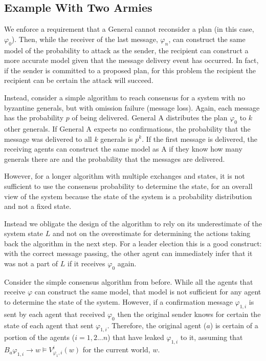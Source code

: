\subsection{Example With Two Armies}

We enforce a requirement that a General cannot reconsider a plan (in this case, $\varphi_0$). Then, while the receiver of the last message, $\varphi_n$, can construct the same model of the probability to attack as the sender, the recipient can construct a more accurate model given that the message delivery event has occurred. In fact, if the sender is committed to a proposed plan, for this problem the recipient the recipient can be certain the attack will succeed.

Instead, consider a simple algorithm to reach consensus for a system with no byzantine generals, but with omission failure (message loss). Again, each message has the probability $p$ of being delivered. General A distributes the plan $\varphi_0$ to $k$ other generals. If General A expects no confirmations, the probability that the message was delivered to all $k$ generals is $p^k$. If the first message is delivered, the receiving agents can construct the same model as A if they know how many generals there are and the probability that the messages are delivered.

However, for a longer algorithm with multiple exchanges and states, it is not sufficient to use the consensus probability to determine the state, for an overall view of the system because the state of the system is a probability distribution and not a fixed state.

Instead we obligate the design of the algorithm to rely on its underestimate of the system state $L$ and not on the overestimate for determining the actions taking back the algorithm in the next step. For a leader election this is a good construct: with the correct message passing, the other agent can immediately infer that it was not a part of $L$ if it receives $\varphi_0$ again. 

Consider the simple consensus algorithm from before. While all the agents that receive $\varphi$ can construct the same model, that model is not sufficient for any agent to determine the state of the system. However, if a confirmation message $\varphi_{1,i}$ is sent by each agent that received $\varphi_0$ then the original sender knows for certain the state of each agent that sent $\varphi_{1,i}$. Therefore, the original agent ($a$) is certain of a portion of the agents ($i=1,2...n$) that have leaked $\varphi_{1,i}$ to it, assuming that $B_a \varphi_{1,i} \rightarrow w \vDash V_{\varphi_1,i}^i(w)$ for the current world, $w$.

